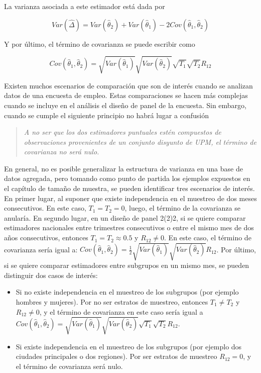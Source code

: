 \documentclass[
  12pt,
]{book}
\begin{document}
La varianza asociada a este estimador está dada por

\[
Var(\hat{\Delta}) 
= Var(\hat{\theta}_2) + Var(\hat{\theta}_1) - 2 Cov(\hat{\theta}_1, \hat{\theta}_2) 
\]

Y por último, el término de covarianza se puede escribir como

\[
Cov(\hat{\theta}_1, \hat{\theta}_2) = \sqrt{Var(\hat{\theta}_1)}\sqrt{Var(\hat{\theta}_2)}\sqrt{T_1}\sqrt{T_2}R_{12}
\]

Existen muchos escenarios de comparación que son de interés cuando se
analizan datos de una encuesta de empleo. Estas comparaciones se hacen
más complejas cuando se incluye en el análisis el diseño de panel de la
encuesta. Sin embargo, cuando se cumple el siguiente principio no habrá
lugar a confusión

\begin{quote}
\emph{A no ser que los dos estimadores puntuales estén compuestos de
observaciones provenientes de un conjunto disyunto de UPM, el término
de covarianza no será nulo.}
\end{quote}

En general, no es posible generalizar la estructura de varianza en una
base de datos agregada, pero tomando como punto de partida los ejemplos
expuestos en el capítulo de tamaño de muestra, se pueden identificar tres escenarios de interés. En primer lugar, al suponer que existe independencia en el muestreo de dos meses consecutivos. En este caso, \(T_1 = T_2 = 0\), luego, el término de la covarianza se anularía. En segundo lugar, en un diseño de panel 2(2)2, si se quiere comparar estimadores nacionales entre trimestres consecutivos o entre el mismo mes de dos años consecutivos, entonces \(T_1 = T_2 \approx 0.5\) y \(R_{12} \neq 0\). En este caso, el término de covarianza sería igual a: \(Cov(\hat{\theta}_1, \hat{\theta}_2) = \frac{1}{2}\sqrt{Var(\hat{\theta}_1)}\sqrt{Var(\hat{\theta}_2)}R_{12}\). Por último, si se quiere comparar estimadores entre subgrupos en un mismo mes, se pueden distinguir dos casos de interés:

\begin{itemize}
\item
  Si no existe independencia en el muestreo de los subgrupos (por ejemplo hombres y mujeres). Por no ser estratos de muestreo, entonces \(T_1 \neq T_2\) y \(R_{12} \neq 0\), y el término de covarianza en este caso sería igual a \(Cov(\hat{\theta}_1, \hat{\theta}_2) = \sqrt{Var(\hat{\theta}_1)}\sqrt{Var(\hat{\theta}_2)}\sqrt{T_1}\sqrt{T_2}R_{12}\).
\item
  Si existe independencia en el muestreo de los subgrupos (por ejemplo dos ciudades principales o dos regiones). Por ser estratos de muestreo \(R_{12} = 0\), y el término de covarianza será nulo.
\end{itemize}
\end{document}

